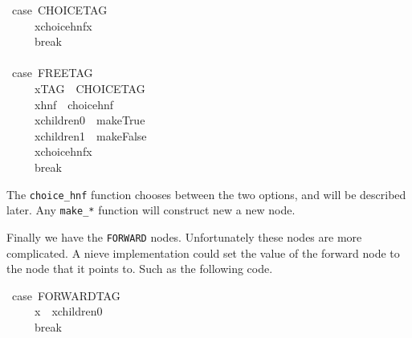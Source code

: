 \documentclass{book}
\theoremstyle{definition}
\begin{document}
{\begin{tabbing}\ttfamily
~case~CHOICETAG\\
\ttfamily ~~~~~xchoicehnfx\\
\ttfamily ~~~~~break\\
\ttfamily ~\\
\ttfamily ~case~FREETAG\\
\ttfamily ~~~~~xTAG~~CHOICETAG\\
\ttfamily ~~~~~xhnf~~choicehnf\\
\ttfamily ~~~~~xchildren0~~makeTrue\\
\ttfamily ~~~~~xchildren1~~makeFalse\\
\ttfamily ~~~~~xchoicehnfx\\
\ttfamily ~~~~~break
\end{tabbing}

The \texttt{choice\_hnf} function chooses between the two options, and will be described later.
Any \texttt{make\_*} function will construct new a new node.

Finally we have the \texttt{FORWARD} nodes.
Unfortunately these nodes are more complicated.
A nieve implementation could set the value of the forward node to the node that it points to.
Such as the following code.

\begin{tabbing}\ttfamily
~case~FORWARDTAG\\
\ttfamily ~~~~~x~~xchildren0\\
\ttfamily ~~~~~break
\end{tabbing}

}
\end{document}

